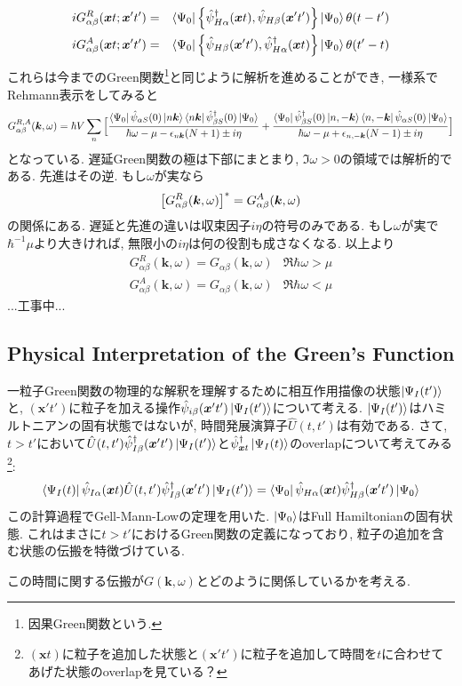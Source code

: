 \documentclass[10.5pt,a4paper]{jreport}
\newcommand{\bx}{\bm{x}}
\newcommand{\bk}{\bm{k}}
\newcommand{\hpsi}{\hat{\psi}}
\begin{document}
\begin{eqnarray}
  iG^R_{\alpha\beta}(\bx t;\bx't') &=& \bra{\Psi_0}\qty{\hpsi^\dagger_{H\alpha}(\bx t), \hpsi_{H\beta}(\bx't')}\ket{\Psi_0}\theta(t-t')\\
  iG^A_{\alpha\beta}(\bx t;\bx't') &=& \bra{\Psi_0}\qty{\hpsi_{H\beta}(\bx't'), \hpsi^\dagger_{H\alpha}(\bx t)}\ket{\Psi_0}\theta(t'-t)
\end{eqnarray}
これらは今までのGreen関数\footnote{因果Green関数という.}と同じように解析を進めることができ, 一様系でRehmann表示をしてみると
\begin{eqnarray}
  G_{\alpha\beta}^{R, A}(\bk, \omega) = \hbar V\sum_n\Big[\frac{\bra{\Psi_0}\hat{\psi}_{\alpha S}(0)\ket{n\bk}\bra{n\bk}\hat{\psi}^\dagger_{\beta S}(0)\ket{\Psi_0}}{\hbar\omega -\mu - \epsilon_{n\bk}\qty(N+1) \pm i\eta}+ \frac{\bra{\Psi_0}\hat{\psi}^\dagger_{\beta S}(0)\ket{n, -\bk}\bra{n, -\bk}\hat{\psi}_{\alpha S}(0)\ket{\Psi_0}}{\hbar\omega -\mu + \epsilon_{n,-\bk}\qty(N-1) \pm i\eta}\Big]\label{green-rehmann2}
\end{eqnarray}
となっている. 遅延Green関数の極は下部にまとまり, $\Im \omega > 0$の領域では解析的である. 先進はその逆. もし$\omega$が実なら
\begin{eqnarray}
  \qty[G_{\alpha\beta}^{R}(\bk, \omega)]^* = G_{\alpha\beta}^{A}(\bk, \omega)
\end{eqnarray}
の関係にある. 遅延と先進の違いは収束因子$i\eta$の符号のみである. もし$\omega$が実で$\hbar^{-1}\mu$より大きければ, 無限小の$i\eta$は何の役割も成さなくなる. 以上より
\begin{eqnarray}
  G_{\alpha\beta}^R(\bk, \omega) = G_{\alpha\beta}(\bk, \omega) & \Re\hbar\omega > \mu\\
  G_{\alpha\beta}^A(\bk, \omega) = G_{\alpha\beta}(\bk, \omega) & \Re\hbar\omega < \mu
\end{eqnarray}
...工事中...
\subsection{Physical Interpretation of the Green's Function}
一粒子Green関数の物理的な解釈を理解するために相互作用描像の状態$\ket{\Psi_I(t')}$と, $(\bx't')$に粒子を加える操作$\hpsi_{i\beta}(\bx't')\ket{\Psi_I(t')}$について考える. $\ket{\Psi_I(t')}$はハミルトニアンの固有状態ではないが, 時間発展演算子$\hat{U}(t, t')$は有効である. さて, $t>t'$において$\hat{U}(t, t')\hpsi_{I\beta}^\dagger(\bx't')\ket{\Psi_I(t')}$と$\hpsi^\dagger_{\bx t}\ket{\Psi_I(t)}$のoverlapについて考えてみる\footnote{$(\bx t)$に粒子を追加した状態と$(\bx't')$に粒子を追加して時間を$t$に合わせてあげた状態のoverlapを見ている？}:
\begin{eqnarray}
  \bra{\Psi_I(t)}\hpsi_{I\alpha}(\bx t)\hat{U}(t, t')\hpsi^\dagger_{I\beta}(\bx't')\ket{\Psi_I(t')} = \bra{\Psi_0}\hpsi_{H\alpha}(\bx t)\hpsi^\dagger_{H\beta}(\bx't')\ket{\Psi_0}
\end{eqnarray}
この計算過程でGell-Mann-Lowの定理を用いた. $\ket{\Psi_0}$はFull Hamiltonianの固有状態. これはまさに$t>t'$におけるGreen関数の定義になっており, 粒子の追加を含む状態の伝搬を特徴づけている.

この時間に関する伝搬が$G(\bk, \omega)$とどのように関係しているかを考える. 
\end{document}
